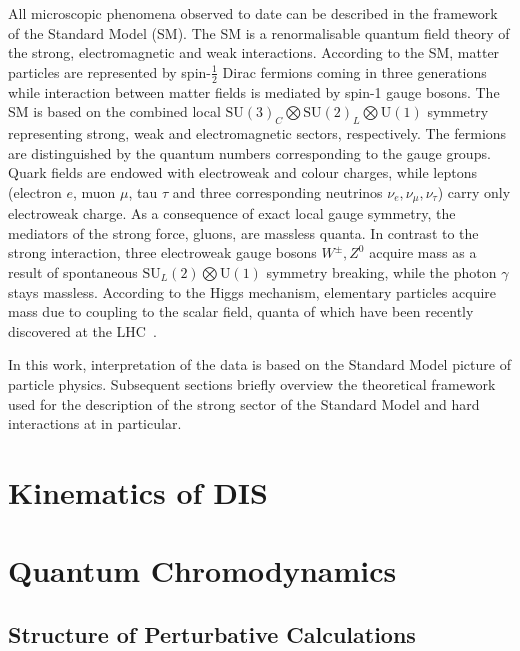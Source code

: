 All microscopic phenomena observed to date can be described in the framework of the Standard Model (SM). The SM is a renormalisable quantum field theory of the strong, electromagnetic and weak interactions. According to the SM, matter particles are represented by spin-$\frac{1}{2}$ Dirac fermions coming in three generations while interaction between matter fields is mediated by spin-1 gauge bosons. The SM is based on the combined local $\mathrm{SU}\left(3\right)_{C} \bigotimes \mathrm{SU}\left(2\right)_{L} \bigotimes \mathrm{U}\left(1\right)$ symmetry representing strong, weak and electromagnetic sectors, respectively. The fermions are distinguished by the quantum numbers corresponding to the gauge groups. Quark fields are endowed with electroweak and colour charges, while leptons (electron $e$, muon $\mu$, tau $\tau$ and three corresponding neutrinos $\nu_e, \nu_\mu, \nu_\tau$) carry only electroweak charge. As a consequence of exact local gauge symmetry, the mediators of the strong force, gluons, are massless quanta. In contrast to the strong interaction, three electroweak gauge bosons $W^\pm, Z^0$ acquire mass as a result of spontaneous $\mathrm{SU}_{L}\left(2\right) \bigotimes \mathrm{U}\left(1\right)$ symmetry breaking, while the photon $\gamma$ stays massless. According to the Higgs mechanism, elementary particles acquire mass due to coupling to the scalar field, quanta of which have been recently discovered at the LHC~\cite{pl:b716:1,pl:b716:30}.

In this work, interpretation of the data is based on the Standard Model picture of particle physics. Subsequent sections briefly overview the theoretical framework used for the description of the strong sector of the Standard Model and hard interactions at \hera in particular.

\section{Kinematics of DIS}
\label{sec:kindis}


\section{Quantum Chromodynamics}


\subsection{Structure of Perturbative Calculations}
\label{subsec:pqcdstructure}


